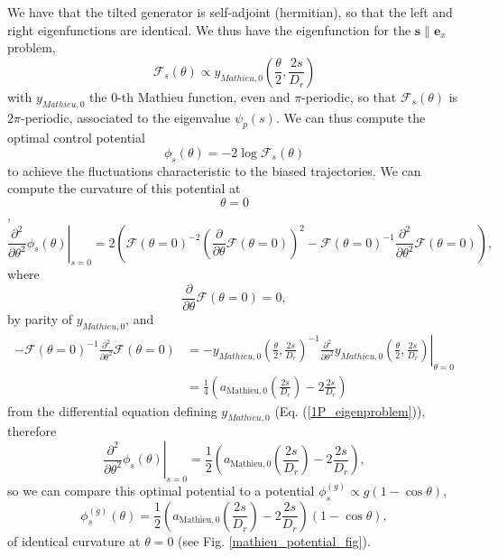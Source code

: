 \documentclass[pre,aps,superscriptaddress,nofootinbib]{revtex4}
\begin{document}
We have that the tilted generator is self-adjoint (hermitian), so that the left and right eigenfunctions are identical. We thus have the eigenfunction for the $\bm{s} \parallel \bm{e}_x$ problem,
\begin{equation}
\mathcal{F}_s(\theta) \propto y_{Mathieu, 0}\left(\frac{\theta}{2}, \frac{2s}{D_r}\right)
\end{equation}
with $y_{Mathieu, 0}$ the $0$-th Mathieu function, even and $\pi$-periodic, so that $\mathcal{F}_s(\theta)$ is $2\pi$-periodic, associated to the eigenvalue $\psi_{p}(s)$. We can thus compute the optimal control potential \cite{jack2019ergodicity}
\begin{equation}
\phi_s(\theta) = - 2 \log \mathcal{F}_s(\theta)
\end{equation}
to achieve the fluctuations characteristic to the biased trajectories. We can compute the curvature of this potential at $$\theta = 0$$,
\begin{equation}
\left. \frac{\partial^2}{\partial \theta^2} \phi_s(\theta) \right|_{s=0} = 2 \left(\mathcal{F}(\theta = 0)^{-2} \left(\frac{\partial}{\partial \theta} \mathcal{F}(\theta = 0)\right)^2 - \mathcal{F}(\theta = 0)^{-1}\frac{\partial^2}{\partial\theta^2} \mathcal{F}(\theta = 0)\right),
\end{equation}
where
\begin{equation}
\frac{\partial}{\partial \theta} \mathcal{F}(\theta = 0) = 0,
\end{equation}
by parity of $y_{Mathieu, 0}$, and
\begin{equation}
\begin{aligned}
- \mathcal{F}(\theta = 0)^{-1}\frac{\partial^2}{\partial\theta^2} \mathcal{F}(\theta = 0) &= \left. - y_{Mathieu, 0}\left(\frac{\theta}{2}, \frac{2s}{D_r}\right)^{-1}\frac{\partial^2}{\partial\theta^2} y_{Mathieu, 0}\left(\frac{\theta}{2}, \frac{2s}{D_r}\right) \right|_{\theta=0}\\
&= \frac{1}{4} \left(a_{\mathrm{Mathieu}, 0}\left(\frac{2s}{D_r}\right) - 2 \frac{2s}{D_r}\right)
\end{aligned}
\end{equation}
from the differential equation defining $y_{Mathieu, 0}$ (Eq. (\ref{1P_eigenproblem})), therefore
\begin{equation}
\left. \frac{\partial^2}{\partial \theta^2} \phi_s(\theta) \right|_{s=0} = \frac{1}{2} \left(a_{\mathrm{Mathieu}, 0}\left(\frac{2s}{D_r}\right) - 2 \frac{2s}{D_r}\right),
\end{equation}
so we can compare this optimal potential to a potential $\phi^{(g)}_s \propto g (1 - \cos\theta)$,
\begin{equation}
\phi^{(g)}_s(\theta) = \frac{1}{2} \left(a_{\mathrm{Mathieu}, 0}\left(\frac{2s}{D_r}\right) - 2 \frac{2s}{D_r}\right) (1 - \cos\theta),
\end{equation}
of identical curvature at $\theta = 0$ (see Fig. \ref{mathieu_potential_fig}).
\end{document}

